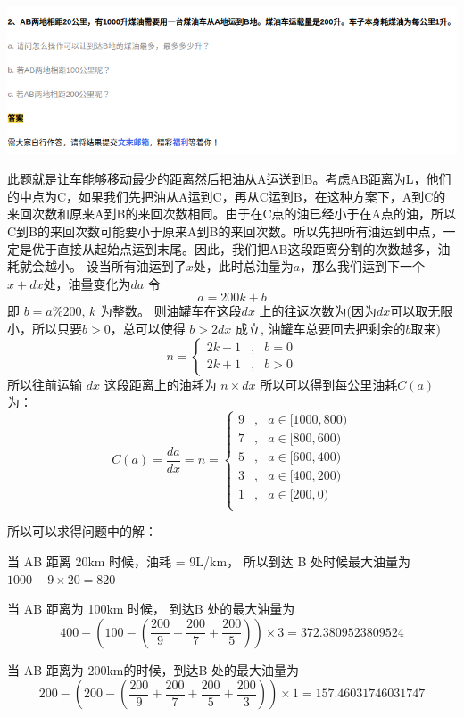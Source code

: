 \documentclass{article}
\begin{document}
\includegraphics[scale=0.5]{oil.png}

此题就是让车能够移动最少的距离然后把油从A运送到B。考虑AB距离为L，他们的中点为C，如果我们先把油从A运到C，再从C运到B，在这种方案下，A到C的来回次数和原来A到B的来回次数相同。由于在C点的油已经小于在A点的油，所以C到B的来回次数可能要小于原来A到B的来回次数。所以先把所有油运到中点，一定是优于直接从起始点运到末尾。因此，我们把AB这段距离分割的次数越多，油耗就会越小。
设当所有油运到了$x$处，此时总油量为$a$，那么我们运到下一个$x+dx$处，油量变化为$da$
令 
$$ a = 200k+ b $$
即 $ b = a \% 200 $, $k$ 为整数。
则油罐车在这段$ dx $ 上的往返次数为(因为$dx$可以取无限小，所以只要$b > 0$，总可以使得 $b > 2dx$ 成立, 油罐车总要回去把剩余的$b$取来)
$$ 
n = \left\{
    \begin{aligned}
        2k - 1 & , & b = 0 \\
        2k + 1 & , & b > 0 
    \end{aligned}
\right.
$$
所以往前运输 $dx$ 这段距离上的油耗为 $n \times dx$ 所以可以得到每公里油耗$C(a)$为：
$$
C(a) = \frac{da}{dx} = n = 
\left\{
    \begin{aligned}
        9 & , & a \in [1000, 800) \\
        7 & , & a \in [800, 600) \\ 
        5 & , & a \in [600, 400) \\
        3 & , & a \in [400, 200) \\
        1 & , & a \in [200, 0) \\
    \end{aligned}
\right.
$$

所以可以求得问题中的解：


当 AB 距离 20km 时候，油耗 = 9L/km， 所以到达 B 处时候最大油量为 $1000 - 9 \times 20 = 820$

当 AB 距离为 100km 时候， 到达B 处的最大油量为
$$ 
400 - (100 - (\frac{200}{9} + \frac{200}{7} + \frac{200}{5})) \times 3 = 372.3809523809524
$$


当 AB 距离为 200km的时候，到达B 处的最大油量为
$$
200 - (200 - (\frac{200}{9} + \frac{200}{7} + \frac{200}{5} + \frac{200}{3})) \times 1 = 157.46031746031747
$$
\end{document}
